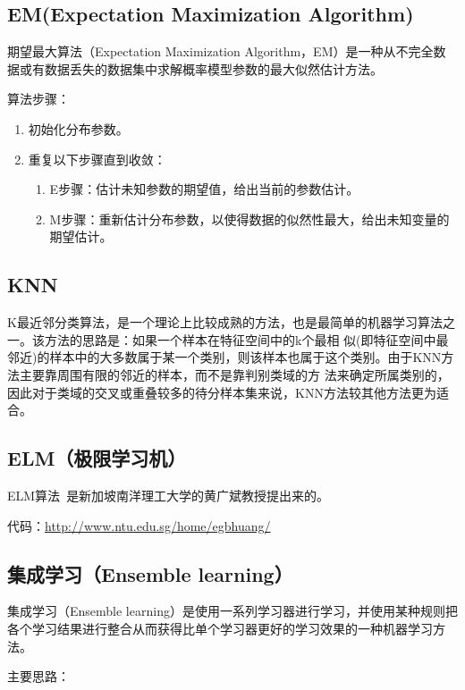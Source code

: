 \documentclass[12pt]{article}
\begin{document}
\subsection{EM(Expectation Maximization Algorithm)}
期望最大算法（Expectation Maximization Algorithm，EM）是一种从不完全数据或有数据丢失的数据集中求解概率模型参数的最大似然估计方法。

{\color{blue}算法步骤}：
\begin{enumerate}
    \item 初始化分布参数。
    \item 重复以下步骤直到收敛：
        \begin{enumerate}
            \item E步骤：估计未知参数的期望值，给出当前的参数估计。
            \item M步骤：重新估计分布参数，以使得数据的似然性最大，给出未知变量的期望估计。
        \end{enumerate}
\end{enumerate}

\subsection{KNN}

K最近邻分类算法，是一个理论上比较成熟的方法，也是最简单的机器学习算法之一。该方法的思路是：如果一个样本在特征空间中的k个最相 似(即特征空间中最邻近)的样本中的大多数属于某一个类别，则该样本也属于这个类别。由于KNN方法主要靠周围有限的邻近的样本，而不是靠判别类域的方 法来确定所属类别的，因此对于类域的交叉或重叠较多的待分样本集来说，KNN方法较其他方法更为适合。

\subsection{ELM（极限学习机）}

ELM算法~\cite{huang2004extreme}是新加坡南洋理工大学的黄广斌教授提出来的。

{\color{blue}代码}：\url{http://www.ntu.edu.sg/home/egbhuang/}

\subsection{集成学习（Ensemble learning）}

集成学习（Ensemble learning）是使用一系列学习器进行学习，并使用某种规则把各个学习结果进行整合从而获得比单个学习器更好的学习效果的一种机器学习方法。

{\color{blue}主要思路}：
\end{document}
